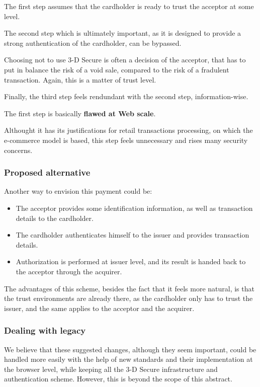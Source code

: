 The first step assumes that the cardholder is ready to trust the
acceptor at some level.

The second step which is ultimately important, as it is designed to
provide a strong authentication of the cardholder, can be bypassed.

Choosing not to use 3-D Secure is often a decision of the acceptor, that
has to put in balance the risk of a void sale, compared to the risk of a
fradulent transaction. Again, this is a matter of trust level.

Finally, the third step feels rendundant with the second step,
information-wise.

The first step is basically \textbf{flawed at Web scale}.

Althought it has its justifications for retail transactions processing,
on which the e-commerce model is based, this step feels unnecessary and
rises many security concerns.

\subsubsection{Proposed alternative}\label{proposed-alternative}

Another way to envision this payment could be:

\begin{itemize}
\item
  The acceptor provides some identification information, as well as
  transaction details to the cardholder.
\item
  The cardholder authenticates himself to the issuer and provides
  transaction details.
\item
  Authorization is performed at issuer level, and its result is handed
  back to the acceptor through the acquirer.
\end{itemize}

The advantages of this scheme, besides the fact that it feels more
natural, is that the trust environments are already there, as the
cardholder only has to trust the issuer, and the same applies to the
acceptor and the acquirer.

\subsubsection{Dealing with legacy}\label{dealing-with-legacy}

We believe that these suggested changes, although they seem important,
could be handled more easily with the help of new standards and their
implementation at the browser level, while keeping all the 3-D Secure
infrastructure and authentication scheme. However, this is beyond the
scope of this abstract.

